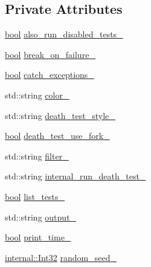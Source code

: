 \subsection*{Private Attributes}
\begin{DoxyCompactItemize}
\item 
\hyperlink{classbool}{bool} \hyperlink{classtesting_1_1internal_1_1GTestFlagSaver_ad940f8cb0287f0498abfbb8cd3f63676}{also\+\_\+run\+\_\+disabled\+\_\+tests\+\_\+}
\item 
\hyperlink{classbool}{bool} \hyperlink{classtesting_1_1internal_1_1GTestFlagSaver_a63eb38f3e9f048128314129a6eadfbaf}{break\+\_\+on\+\_\+failure\+\_\+}
\item 
\hyperlink{classbool}{bool} \hyperlink{classtesting_1_1internal_1_1GTestFlagSaver_a7ea119ac4f2b4410bb97a85aaa753ff2}{catch\+\_\+exceptions\+\_\+}
\item 
std\+::string \hyperlink{classtesting_1_1internal_1_1GTestFlagSaver_a0ea1a453d5a44ba56a80b7e9c3ce9097}{color\+\_\+}
\item 
std\+::string \hyperlink{classtesting_1_1internal_1_1GTestFlagSaver_aaafc84990f1c135a56f8a1e5009adf7e}{death\+\_\+test\+\_\+style\+\_\+}
\item 
\hyperlink{classbool}{bool} \hyperlink{classtesting_1_1internal_1_1GTestFlagSaver_a9b243970df7a8d33764537f358ebe384}{death\+\_\+test\+\_\+use\+\_\+fork\+\_\+}
\item 
std\+::string \hyperlink{classtesting_1_1internal_1_1GTestFlagSaver_ac4de0e4e127f7b08112dfbd564f24000}{filter\+\_\+}
\item 
std\+::string \hyperlink{classtesting_1_1internal_1_1GTestFlagSaver_ac609bb5e1a2433d5d1bec59305b363b1}{internal\+\_\+run\+\_\+death\+\_\+test\+\_\+}
\item 
\hyperlink{classbool}{bool} \hyperlink{classtesting_1_1internal_1_1GTestFlagSaver_ac9cdb0db488527001acc3f34f066cce3}{list\+\_\+tests\+\_\+}
\item 
std\+::string \hyperlink{classtesting_1_1internal_1_1GTestFlagSaver_a65da6ec2943af0a71343efc0e5e96286}{output\+\_\+}
\item 
\hyperlink{classbool}{bool} \hyperlink{classtesting_1_1internal_1_1GTestFlagSaver_a3a5791fa995e8fd348683afa1d5b0150}{print\+\_\+time\+\_\+}
\item 
\hyperlink{namespacetesting_1_1internal_a8ee38faaf875f133358abaf9bc056cec}{internal\+::\+Int32} \hyperlink{classtesting_1_1internal_1_1GTestFlagSaver_a58abf7990f96e4c8ebee143fbcbb8840}{random\+\_\+seed\+\_\+}
\item 

\end{DoxyCompactItemize}
